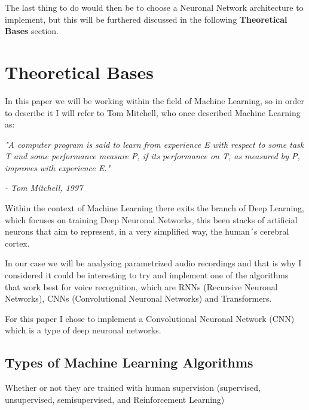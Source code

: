 \documentclass[12pt, a4paper]{article}
\begin{document}
	The last thing to do would then be to choose a Neuronal Network architecture to implement, but this will be furthered discussed in the following \textbf{Theoretical Bases} section.
	
	\clearpage
	
	\section{Theoretical Bases}
	
	In this paper we will be working within the field of Machine Learning, so in order to describe it I will refer to Tom Mitchell, who once described Machine Learning as: 
	
	\textit{"A computer program is said to learn from experience E with respect to some task T and some performance measure P, if its performance on T, as measured by P, improves with experience E."}
	\begin{flushright}
		\textit{- Tom Mitchell, 1997 \cite{handsonmachinelearning}}
	\end{flushright}
	
	Within the context of Machine Learning there exits the branch of Deep Learning, which focuses on training Deep Neuronal Networks, this been stacks of artificial neurons that aim to represent, in a very simplified way, the human´s cerebral cortex. 
	
	In our case we will be analysing parametrized audio recordings and that is why I considered it could be interesting to try and implement one of the algorithms that work best for voice recognition, which are RNNs (Recursive Neuronal Networks), CNNs (Convolutional Neuronal Networks) and Transformers.
	
	For this paper I chose to implement a Convolutional Neuronal Network (CNN) which is a type of deep neuronal networks.
	
	
	
	
	\clearpage
	
	\subsection{Types of Machine Learning Algorithms}
	
	Whether or not they are trained with human supervision (supervised, unsupervised, semisupervised, and Reinforcement Learning)
	
\end{document}
